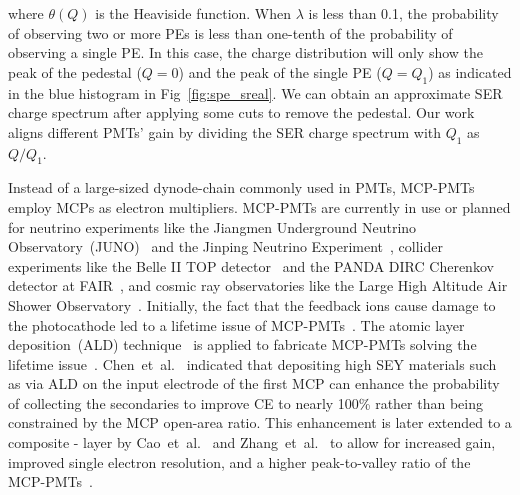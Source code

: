 where $\theta(Q)$ is the Heaviside function.
When $\lambda$ is less than 0.1,
the probability of observing two or more PEs is less than one-tenth of the probability of observing a single PE.
In this case, the charge distribution will only show the peak of the pedestal ($Q=0$) and the peak of the single PE ($Q=Q_1$) as indicated in the blue histogram in Fig~\ref{fig:spe_sreal}.
We can obtain an approximate SER charge spectrum after applying some cuts to remove the pedestal.
Our work aligns different PMTs' gain by dividing the SER charge spectrum with $Q_1$ as $Q/Q_1$.

Instead of a large-sized dynode-chain commonly used in PMTs,
MCP-PMTs employ MCPs as electron multipliers.
MCP-PMTs are currently in use or planned for neutrino experiments
like the Jiangmen Underground Neutrino Observatory~(JUNO)~\cite{ZHU2020162002} and the Jinping Neutrino Experiment~\cite{Zhang:2023ued},
collider experiments like the Belle II TOP detector~\cite{MATSUOKA2014148} and the PANDA DIRC Cherenkov detector at FAIR~\cite{KRAUSS2023168659},
and cosmic ray observatories like the Large High Altitude Air Shower Observatory~\cite{Cao2019UpgradingPT}.
Initially, the fact that the feedback ions cause damage to the photocathode
led to a lifetime issue of MCP-PMTs~\cite{N2006Lifetime}.
The atomic layer deposition~(ALD) technique~\cite{reviewer2, 2012An}
is applied to fabricate MCP-PMTs solving the lifetime issue~\cite{Lehmann:2022ret}.
Chen~et~al.~\cite{2016Optimization} indicated that depositing high SEY materials
such as  via ALD on the input electrode of the first MCP
can enhance the probability of collecting the secondaries to improve CE
to nearly 100\% rather than being constrained by the MCP open-area ratio.
This enhancement is later extended to a composite - layer
by Cao~et~al.~\cite{cao_secondary_2021} and Zhang~et~al.~\cite{zzj2021Al}
to allow for increased gain, improved single electron resolution,
and a higher peak-to-valley ratio of the MCP-PMTs~\cite{2021Effects}.

